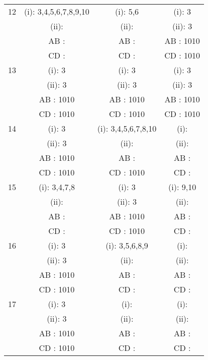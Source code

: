 \begin{table}[h]
{\begin{tabular}{| c || c | c | c |}
12 & (i): 3,4,5,6,7,8,9,10 & (i): 5,6 & \cellcolor{lightgray}(i): 3\\
 & (ii):  & (ii):  & \cellcolor{lightgray}(ii): 3\\
 & AB :  & AB :  & \cellcolor{lightgray}AB : 1010\\
 & CD :  & CD :  & \cellcolor{lightgray}CD : 1010\\\hline

13 & \cellcolor{lightgray}(i): 3 & \cellcolor{lightgray}(i): 3 & \cellcolor{lightgray}(i): 3\\
 & \cellcolor{lightgray}(ii): 3 & \cellcolor{lightgray}(ii): 3 & \cellcolor{lightgray}(ii): 3\\
 & \cellcolor{lightgray}AB : 1010 & \cellcolor{lightgray}AB : 1010 & \cellcolor{lightgray}AB : 1010\\
 & \cellcolor{lightgray}CD : 1010 & \cellcolor{lightgray}CD : 1010 & \cellcolor{lightgray}CD : 1010\\\hline

14 & \cellcolor{lightgray}(i): 3 & (i): 3,4,5,6,7,8,10 & (i): \\
 & \cellcolor{lightgray}(ii): 3 & (ii):  & (ii): \\
 & \cellcolor{lightgray}AB : 1010 & AB :  & AB : \\
 & \cellcolor{lightgray}CD : 1010 & CD : 1010 & CD : \\\hline

15 & (i): 3,4,7,8 & \cellcolor{lightgray}(i): 3 & (i): 9,10\\
 & (ii):  & \cellcolor{lightgray}(ii): 3 & (ii): \\
 & AB :  & \cellcolor{lightgray}AB : 1010 & AB : \\
 & CD :  & \cellcolor{lightgray}CD : 1010 & CD : \\\hline

16 & \cellcolor{lightgray}(i): 3 & (i): 3,5,6,8,9 & (i): \\
 & \cellcolor{lightgray}(ii): 3 & (ii):  & (ii): \\
 & \cellcolor{lightgray}AB : 1010 & AB :  & AB : \\
 & \cellcolor{lightgray}CD : 1010 & CD :  & CD : \\\hline

17 & \cellcolor{lightgray}(i): 3 & (i):  & (i): \\
 & \cellcolor{lightgray}(ii): 3 & (ii):  & (ii): \\
 & \cellcolor{lightgray}AB : 1010 & AB :  & AB : \\
 & \cellcolor{lightgray}CD : 1010 & CD :  & CD : \\\hline




\end{tabular}}
\end{table}
